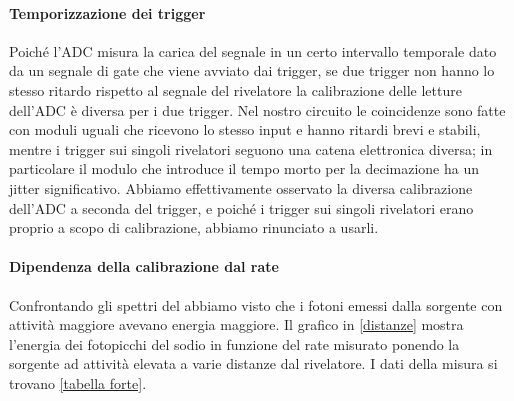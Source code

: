 \paragraph{Temporizzazione dei trigger}

%
Poiché l'ADC misura la carica del segnale in un certo intervallo temporale dato da un segnale di gate
che viene avviato dai trigger,
se due trigger non hanno lo stesso ritardo rispetto al segnale del rivelatore
la calibrazione delle letture dell'ADC è diversa per i due trigger.
Nel nostro circuito le coincidenze sono fatte con moduli uguali che ricevono lo stesso input
e hanno ritardi brevi e stabili,
mentre i trigger sui singoli rivelatori seguono una catena elettronica diversa;
in particolare il modulo che introduce il tempo morto per la decimazione ha un jitter significativo.
Abbiamo effettivamente osservato la diversa calibrazione dell'ADC a seconda del trigger,
e poiché i trigger sui singoli rivelatori erano proprio a scopo di calibrazione, abbiamo rinunciato a usarli.

\paragraph{Dipendenza della calibrazione dal rate}

Confrontando gli spettri del \na{} abbiamo visto che i fotoni emessi dalla sorgente con attività maggiore avevano energia maggiore.
Il grafico in \autoref{distanze} mostra l'energia dei fotopicchi del sodio in funzione del rate misurato ponendo la sorgente ad attività elevata a varie distanze dal rivelatore.
I dati della misura si trovano \autoref{tabella forte}.

